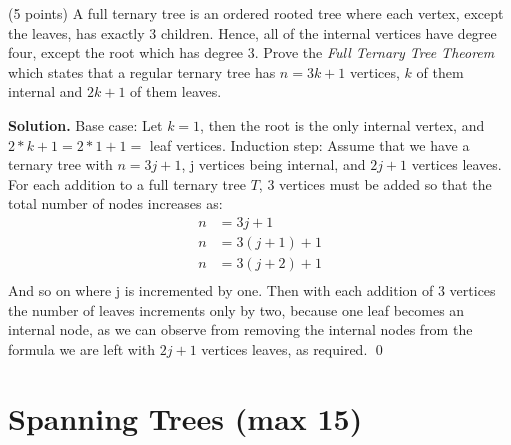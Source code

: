 \documentclass[a4paper,11pt]{amsart}
\newcounter{temp}
\newcounter{prob_counter}
\newenvironment{problem}
{\begin{list}{{\bf \arabic{prob_counter}}}{
      \usecounter{prob_counter}
      \addtolength{\labelsep}{.6ex}
      \addtolength{\itemsep}{4.3ex}
      \setlength{\leftmargin}{1.4em}}
      \setcounter{prob_counter}{\value{temp}}
}
{\setcounter{temp}{\value{prob_counter}}  
  \end{list}
}
\newenvironment{solution}{\textbf{Solution.}}{\qed}
\begin{document}
\begin{problem}
 \item (5 points) A full ternary tree is an ordered rooted tree where each vertex, except the leaves, has 
 exactly $3$ children. Hence, all of the internal vertices have degree four, except the root which has degree 
 $3$. Prove the \textit{Full Ternary Tree Theorem} which states that a regular ternary tree has $n = 3k+1$ vertices,
 $k$ of them internal and $2k+1$ of them leaves.
\end{problem}
\begin{solution}
	Base case: Let $k = 1$, then the root is the only internal vertex, and $2 * k + 1 = 2 * 1 + 1 = $ leaf vertices.
	Induction step: Assume that we have a ternary tree with $n = 3j+1$, j vertices being internal, and $2j +1$ vertices leaves. \\
	For each addition to a full ternary tree $T$, 3 vertices must be added so that the total number of nodes increases as:
\begin{equation} \label{eq1}
\begin{split}
n & = 3j + 1 \\
n & = 3(j + 1) + 1 \\
n & = 3(j + 2) + 1 \\
\end{split}
\end{equation}
And so on where j is incremented by one. Then with each addition of 3 vertices the number of leaves increments only by two, 
because one leaf becomes an internal node, as we can observe from removing the internal nodes from the formula we are left with $2j +1$ vertices leaves, as required. 
\end{solution}




\section{Spanning Trees ({\bf max 15})}
\end{document}
